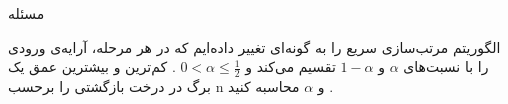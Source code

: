 ‌مسئله

الگوریتم مرتب‌سازی سریع را به گونه‌ای تغییر داده‌ایم که در هر مرحله، آرایه‌ی ورودی را با نسبت‌های 
$\alpha$ 
 و
$1-\alpha$
تقسیم می‌کند و 
$ 0<\alpha\leq\frac{1}{2}$
.
کم‌ترین و بیشترین عمق یک برگ در درخت بازگشتی را برحسب 
 n
 و
$\alpha$ 
محاسبه کنید
.
 









